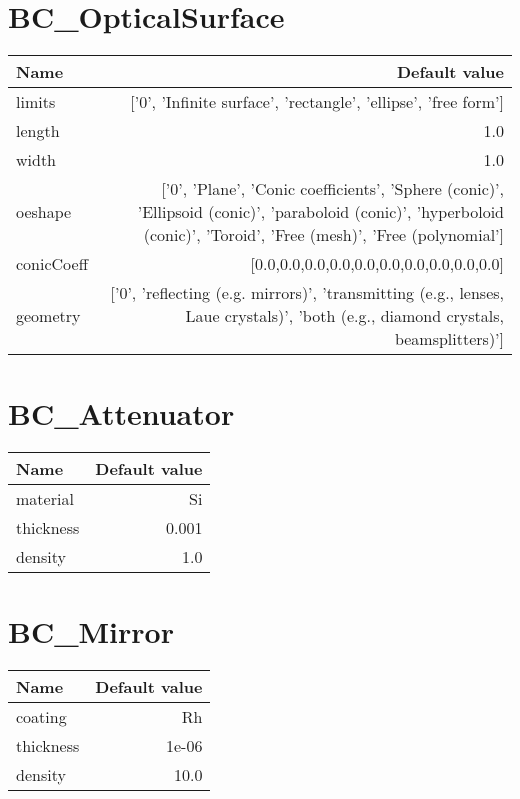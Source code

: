 \documentclass{article}
\begin{document}
\section{BC\_OpticalSurface}
\begin{tabular}{lr}
Name & Default value \\
\hline
limits & ['0', 'Infinite surface', 'rectangle', 'ellipse', 'free form'] \\
length & 1.0 \\
width & 1.0 \\
oeshape & ['0', 'Plane', 'Conic coefficients', 'Sphere (conic)', 'Ellipsoid (conic)', 'paraboloid (conic)', 'hyperboloid (conic)', 'Toroid', 'Free (mesh)', 'Free (polynomial'] \\
conicCoeff & [0.0,0.0,0.0,0.0,0.0,0.0,0.0,0.0,0.0,0.0] \\
geometry & ['0', 'reflecting (e.g. mirrors)', 'transmitting (e.g., lenses, Laue crystals)', 'both (e.g., diamond crystals, beamsplitters)'] \\
   
\end{tabular}



\section{BC\_Attenuator}
\begin{tabular}{lr}
Name & Default value \\
\hline
material & Si \\
thickness & 0.001 \\
density & 1.0 \\
   
\end{tabular}



\section{BC\_Mirror}
\begin{tabular}{lr}
Name & Default value \\
\hline
coating & Rh \\
thickness & 1e-06 \\
density & 10.0 \\
   
\end{tabular}
\end{document}

